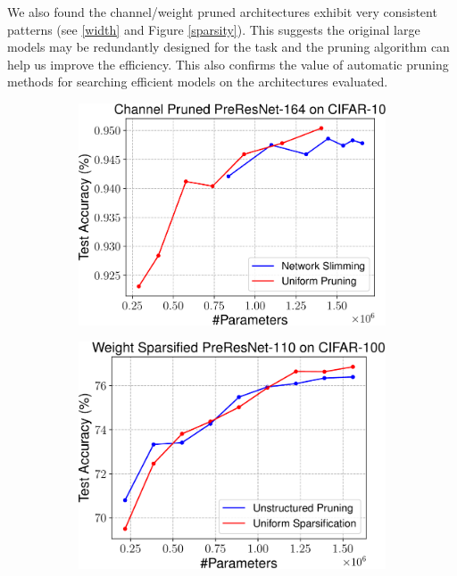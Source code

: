 We also found the channel/weight pruned architectures exhibit very consistent patterns (see \autoref{width} and Figure \ref{sparsity}). 
This suggests the original large models may be redundantly designed for the task and the pruning algorithm can help us improve the efficiency. 
This also confirms the value of automatic pruning methods for searching efficient models on the architectures evaluated.


\begin{figure}[!ht]
\centering
\begin{minipage}{.325\textwidth}
 \begin{subfigure}{\textwidth}
 \centering
 \includegraphics[width=\textwidth]{figures/slimming-preresnet-164-cifar10-crop.pdf}
 \end{subfigure}
\end{minipage}
\begin{minipage}{.325\textwidth}
 \begin{subfigure}{\textwidth}
 \centering
\includegraphics[width=\textwidth]{figures/weight-level-preresnet-110-cifar100-crop.pdf}

\end{subfigure}
\end{minipage}
\end{figure}

